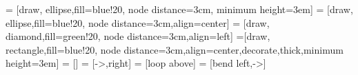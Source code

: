  = [draw, ellipse,fill=blue!20, node distance=3cm,
    minimum height=3em]
 = [draw, ellipse,fill=blue!20, node distance=3cm,align=center]
 = [draw, diamond,fill=green!20, node distance=3cm,align=left]
 =[draw, rectangle,fill=blue!20, node distance=3cm,align=center,decorate,thick,minimum height=3em]
 = []   
 = [->,right] %
 = [loop above]
 = [bend left,->]




\def\alphainsection{0}

\let\oldsection=\section
\def\section{%
  \ifnum\alphainsection=1%
    \addtocounter{alphasect}{1}
  \fi%
\oldsection}%

\renewcommand\thesection{%
  \ifnum\alphainsection=1%
    \Alph{alphasect}
  \else%
    \arabic{section}
  \fi%
}%

\newenvironment{alphasection}{%
  \ifnum\alphainsection=1%
    \errhelp={Let other blocks end at the beginning of the next block.}
    \errmessage{Nested Alpha section not allowed}
  \fi%
  \setcounter{alphasect}{0}
  \def\alphainsection{1}
}{%
  \setcounter{alphasect}{0}
  \def\alphainsection{0}
}%


\makeatletter
\newcommand*{\currentname}{\@currentlabelname}
\makeatother

